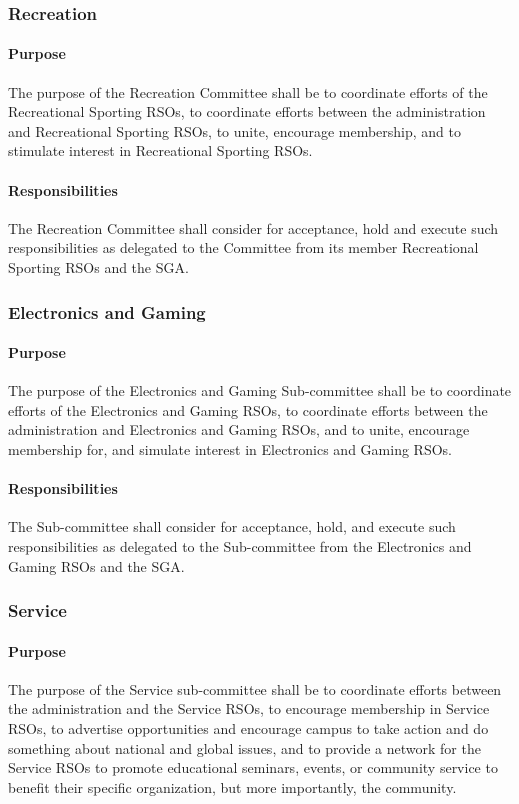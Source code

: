 \documentclass[12pt]{scrreprt}
\begin{document}
\subsubsection{Recreation}

\paragraph{Purpose}
The purpose of the Recreation Committee shall be to coordinate efforts of the 
Recreational Sporting RSOs, to coordinate efforts between the administration 
and Recreational Sporting RSOs, to unite, encourage membership, and to 
stimulate interest in Recreational Sporting RSOs.

\paragraph{Responsibilities}
The Recreation Committee shall consider for acceptance, hold and execute such
responsibilities as delegated to the Committee from its member Recreational
Sporting RSOs and the SGA.

\subsubsection{Electronics and Gaming}

\paragraph{Purpose}
The purpose of the Electronics and Gaming Sub-committee shall be to coordinate efforts of the Electronics and Gaming RSOs, to coordinate efforts between the administration and Electronics and Gaming RSOs, and to unite, encourage membership for, and simulate interest in Electronics and Gaming RSOs.

\paragraph{Responsibilities}
The Sub-committee shall consider for acceptance, hold, and execute such responsibilities as delegated to the Sub-committee from the Electronics and Gaming RSOs and the SGA.

\subsubsection{Service}

\paragraph{Purpose}
The purpose of the Service sub-committee shall be to coordinate
efforts between the administration and the Service RSOs, to encourage
membership in Service RSOs, to advertise opportunities and encourage
campus to take action and do something about national and global
issues, and to provide a network for the Service RSOs to promote
educational seminars, events, or community service to benefit their
specific organization, but more importantly, the community.
\end{document}
